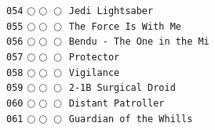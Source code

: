 \documentclass[a4paper,landscape]{article}
\begin{document}
\begin{multicols*}{5}
\texttt{054} \(\bigcirc\!\bigcirc\!\bigcirc\)  \texttt{Jedi Lightsaber} \vspace{-0.3mm}\\ 
\texttt{055} \(\bigcirc\!\bigcirc\!\bigcirc\)  \texttt{The Force Is With Me} \vspace{-0.3mm}\\ 
\texttt{056} \(\bigcirc\!\bigcirc\!\bigcirc\)  \texttt{Bendu - The One in the Mi} \vspace{-0.3mm}\\ 
\texttt{057} \(\bigcirc\!\bigcirc\!\bigcirc\)  \texttt{Protector} \vspace{-0.3mm}\\ 
\texttt{058} \(\bigcirc\!\bigcirc\!\bigcirc\)  \texttt{Vigilance} \vspace{-0.3mm}\\ 
\texttt{059} \(\bigcirc\!\bigcirc\!\bigcirc\)  \texttt{2-1B Surgical Droid} \vspace{-0.3mm}\\ 
\texttt{060} \(\bigcirc\!\bigcirc\!\bigcirc\)  \texttt{Distant Patroller} \vspace{-0.3mm}\\ 
\texttt{061} \(\bigcirc\!\bigcirc\!\bigcirc\)  \texttt{Guardian of the Whills} \vspace{-0.3mm}\\ 

\end{multicols*}
\end{document}
